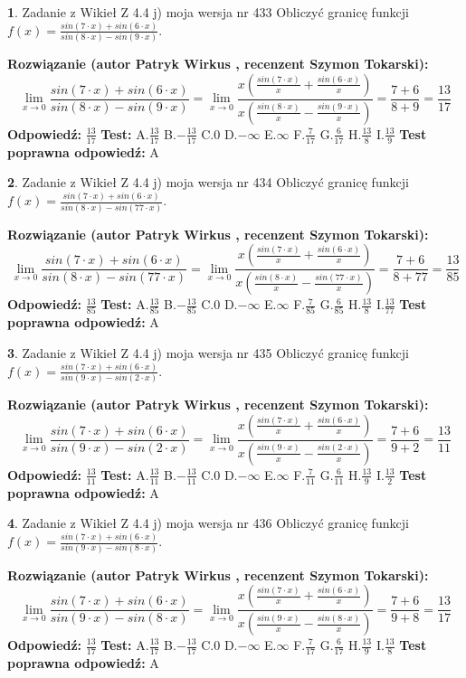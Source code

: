 \documentclass[12pt, a4paper]{article}
\theoremstyle{definition} %
\newtheorem{zad}{}
\newcommand{\zadStart}[1]{\begin{zad}#1\newline}
\newcommand{\zadStop}{\end{zad}}
\newcommand{\rozwStart}[2]{\noindent \textbf{Rozwiązanie (autor #1 , recenzent #2): }\newline}
\newcommand{\rozwStop}{\newline}
\newcommand{\odpStart}{\noindent \textbf{Odpowiedź:}\newline}
\newcommand{\odpStop}{\newline}
\newcommand{\testStart}{\noindent \textbf{Test:}\newline}
\newcommand{\testStop}{\newline}
\newcommand{\kluczStart}{\noindent \textbf{Test poprawna odpowiedź:}\newline}
\newcommand{\kluczStop}{\newline}
\begin{document}
\zadStart{Zadanie z Wikieł Z 4.4 j) moja wersja nr 433}
Obliczyć granicę funkcji $f(x)=\frac{sin(7\cdot x) +sin(6\cdot x)}{sin(8\cdot x) -sin(9\cdot x)}$.
\zadStop
\rozwStart{Patryk Wirkus}{Szymon Tokarski}
$$\lim\limits_{x\to 0}\frac{sin(7\cdot x) +sin(6\cdot x)}{sin(8\cdot x) -sin(9\cdot x)}=\lim\limits_{x\to 0}\frac{x(\frac{sin(7\cdot x)}{x}+\frac{sin(6\cdot x)}{x})}{x(\frac{sin(8\cdot x)}{x}-\frac{sin(9\cdot x)}{x})}=\frac{7+6}{8+9} = \frac{13}{17}$$
\rozwStop
\odpStart
$\frac{13}{17}$
\odpStop
\testStart
A.$\frac{13}{17}$
B.$-\frac{13}{17}$
C.$0$
D.$-\infty$
E.$\infty$
F.$\frac{7}{17}$
G.$\frac{6}{17}$
H.$\frac{13}{8}$
I.$\frac{13}{9}$
\testStop
\kluczStart
A
\kluczStop



\zadStart{Zadanie z Wikieł Z 4.4 j) moja wersja nr 434}
Obliczyć granicę funkcji $f(x)=\frac{sin(7\cdot x) +sin(6\cdot x)}{sin(8\cdot x) -sin(77\cdot x)}$.
\zadStop
\rozwStart{Patryk Wirkus}{Szymon Tokarski}
$$\lim\limits_{x\to 0}\frac{sin(7\cdot x) +sin(6\cdot x)}{sin(8\cdot x) -sin(77\cdot x)}=\lim\limits_{x\to 0}\frac{x(\frac{sin(7\cdot x)}{x}+\frac{sin(6\cdot x)}{x})}{x(\frac{sin(8\cdot x)}{x}-\frac{sin(77\cdot x)}{x})}=\frac{7+6}{8+77} = \frac{13}{85}$$
\rozwStop
\odpStart
$\frac{13}{85}$
\odpStop
\testStart
A.$\frac{13}{85}$
B.$-\frac{13}{85}$
C.$0$
D.$-\infty$
E.$\infty$
F.$\frac{7}{85}$
G.$\frac{6}{85}$
H.$\frac{13}{8}$
I.$\frac{13}{77}$
\testStop
\kluczStart
A
\kluczStop



\zadStart{Zadanie z Wikieł Z 4.4 j) moja wersja nr 435}
Obliczyć granicę funkcji $f(x)=\frac{sin(7\cdot x) +sin(6\cdot x)}{sin(9\cdot x) -sin(2\cdot x)}$.
\zadStop
\rozwStart{Patryk Wirkus}{Szymon Tokarski}
$$\lim\limits_{x\to 0}\frac{sin(7\cdot x) +sin(6\cdot x)}{sin(9\cdot x) -sin(2\cdot x)}=\lim\limits_{x\to 0}\frac{x(\frac{sin(7\cdot x)}{x}+\frac{sin(6\cdot x)}{x})}{x(\frac{sin(9\cdot x)}{x}-\frac{sin(2\cdot x)}{x})}=\frac{7+6}{9+2} = \frac{13}{11}$$
\rozwStop
\odpStart
$\frac{13}{11}$
\odpStop
\testStart
A.$\frac{13}{11}$
B.$-\frac{13}{11}$
C.$0$
D.$-\infty$
E.$\infty$
F.$\frac{7}{11}$
G.$\frac{6}{11}$
H.$\frac{13}{9}$
I.$\frac{13}{2}$
\testStop
\kluczStart
A
\kluczStop



\zadStart{Zadanie z Wikieł Z 4.4 j) moja wersja nr 436}
Obliczyć granicę funkcji $f(x)=\frac{sin(7\cdot x) +sin(6\cdot x)}{sin(9\cdot x) -sin(8\cdot x)}$.
\zadStop
\rozwStart{Patryk Wirkus}{Szymon Tokarski}
$$\lim\limits_{x\to 0}\frac{sin(7\cdot x) +sin(6\cdot x)}{sin(9\cdot x) -sin(8\cdot x)}=\lim\limits_{x\to 0}\frac{x(\frac{sin(7\cdot x)}{x}+\frac{sin(6\cdot x)}{x})}{x(\frac{sin(9\cdot x)}{x}-\frac{sin(8\cdot x)}{x})}=\frac{7+6}{9+8} = \frac{13}{17}$$
\rozwStop
\odpStart
$\frac{13}{17}$
\odpStop
\testStart
A.$\frac{13}{17}$
B.$-\frac{13}{17}$
C.$0$
D.$-\infty$
E.$\infty$
F.$\frac{7}{17}$
G.$\frac{6}{17}$
H.$\frac{13}{9}$
I.$\frac{13}{8}$
\testStop
\kluczStart
A
\kluczStop
\end{document}
